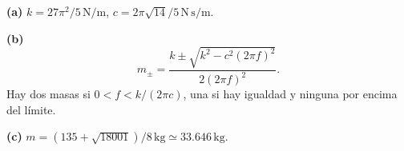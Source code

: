 \noindent\textbf{(a)} \(k=27\pi^2/5\,\mathrm{N/m}\), \(c=2\pi\sqrt{14}/5\,\mathrm{N\,s/m}\).

\noindent\textbf{(b)} \[m_\pm=\frac{k\pm\sqrt{k^2-c^2(2\pi f)^2}}{2(2\pi f)^2}.\]
Hay dos masas si \(0<f<k/(2\pi c)\), una si hay igualdad y ninguna por encima del límite.

\noindent\textbf{(c)} \(m=(135+\sqrt{18001})/8\,\mathrm{kg}\simeq33.646\,\mathrm{kg}\).
